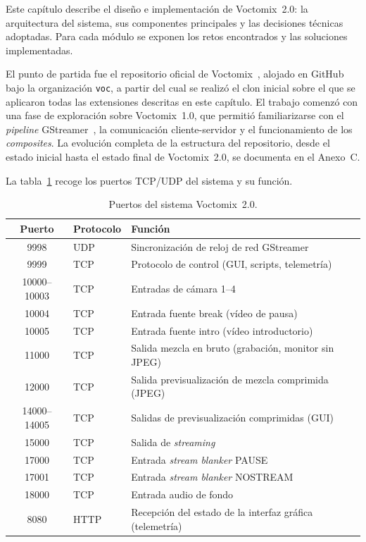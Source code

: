 Este capítulo describe el diseño e implementación de Voctomix~2.0: la arquitectura
del sistema, sus componentes principales y las decisiones técnicas adoptadas. Para
cada módulo se exponen los retos encontrados y las soluciones implementadas.

El punto de partida fue el repositorio oficial de Voctomix~\cite{voctomix_github},
alojado en GitHub bajo la organización \texttt{voc}, a partir del cual se realizó el
clon inicial sobre el que se aplicaron todas las extensiones descritas en este capítulo.
El trabajo comenzó con una fase de exploración sobre Voctomix~1.0, que permitió
familiarizarse con el \textit{pipeline} GStreamer~\cite{gstreamer_docs}, la comunicación cliente-servidor y
el funcionamiento de los \textit{composites}. La evolución completa de la estructura del
repositorio, desde el estado inicial hasta el estado final de Voctomix~2.0, se
documenta en el Anexo~C.

La tabla~\ref{tab:puertos_sistema} recoge los puertos TCP/UDP del sistema y su función.

\begin{table}[H]
  \centering
  \caption{Puertos del sistema Voctomix~2.0.}
  \label{tab:puertos_sistema}
  \begin{tabular}{|c|l|l|}
    \hline
    \textbf{Puerto} & \textbf{Protocolo} & \textbf{Función} \\
    \hline
    9998         & UDP  & Sincronización de reloj de red GStreamer \\
    9999         & TCP  & Protocolo de control (GUI, scripts, telemetría) \\
    10000--10003 & TCP  & Entradas de cámara 1--4 \\
    10004        & TCP  & Entrada fuente break (vídeo de pausa) \\
    10005        & TCP  & Entrada fuente intro (vídeo introductorio) \\
    11000        & TCP  & Salida mezcla en bruto (grabación, monitor sin JPEG) \\
    12000        & TCP  & Salida previsualización de mezcla comprimida (JPEG) \\
    14000--14005 & TCP  & Salidas de previsualización comprimidas (GUI) \\
    15000        & TCP  & Salida de \textit{streaming} \\
    17000        & TCP  & Entrada \textit{stream blanker} PAUSE \\
    17001        & TCP  & Entrada \textit{stream blanker} NOSTREAM \\
    18000        & TCP  & Entrada audio de fondo \\
    8080         & HTTP & Recepción del estado de la interfaz gráfica (telemetría) \\
    \hline
  \end{tabular}
\end{table}

